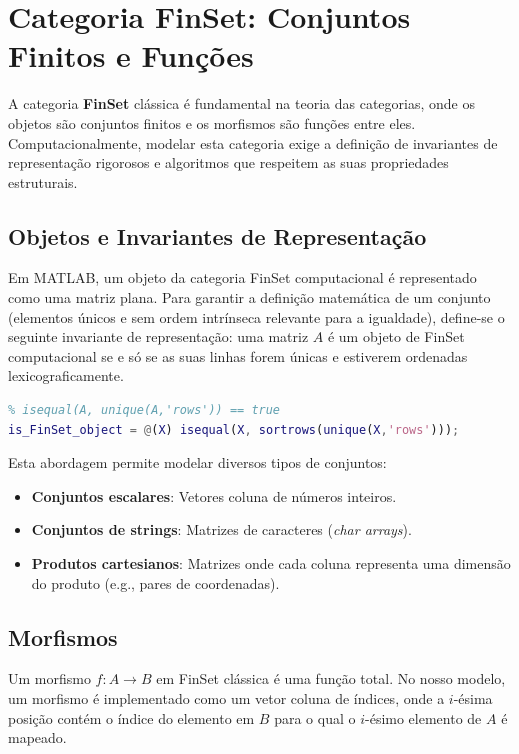 
\section{Categoria FinSet: Conjuntos Finitos e Funções}
A categoria \textbf{FinSet} clássica é fundamental na teoria das categorias, onde os objetos são conjuntos finitos e os morfismos são funções entre eles. Computacionalmente, modelar esta categoria exige a definição de invariantes de representação rigorosos e algoritmos que respeitem as suas propriedades estruturais.

\subsection{Objetos e Invariantes de Representação}
Em MATLAB, um objeto da categoria FinSet computacional é representado como uma matriz plana. Para garantir a definição matemática de um conjunto (elementos únicos e sem ordem intrínseca relevante para a igualdade), define-se o seguinte invariante de representação: uma matriz $A$ é um objeto de FinSet computacional se e só se as suas linhas forem únicas e estiverem ordenadas lexicograficamente.

\begin{lstlisting}[language=Matlab, caption={Definição do invariante de objetos em FinSet}]
% Um objeto de FinSet é uma matriz MATLAB A tal que:
% isequal(A, unique(A,'rows')) == true
is_FinSet_object = @(X) isequal(X, sortrows(unique(X,'rows')));
\end{lstlisting}

Esta abordagem permite modelar diversos tipos de conjuntos:
\begin{itemize}
    \item \textbf{Conjuntos escalares}: Vetores coluna de números inteiros.
    \item \textbf{Conjuntos de strings}: Matrizes de caracteres (\textit{char arrays}).
    \item \textbf{Produtos cartesianos}: Matrizes onde cada coluna representa uma dimensão do produto (e.g., pares de coordenadas).
\end{itemize}

\subsection{Morfismos}
Um morfismo $f: A \to B$ em FinSet clássica é uma função total. No nosso modelo, um morfismo é implementado como um vetor coluna de índices, onde a $i$-ésima posição contém o índice do elemento em $B$ para o qual o $i$-ésimo elemento de $A$ é mapeado.

